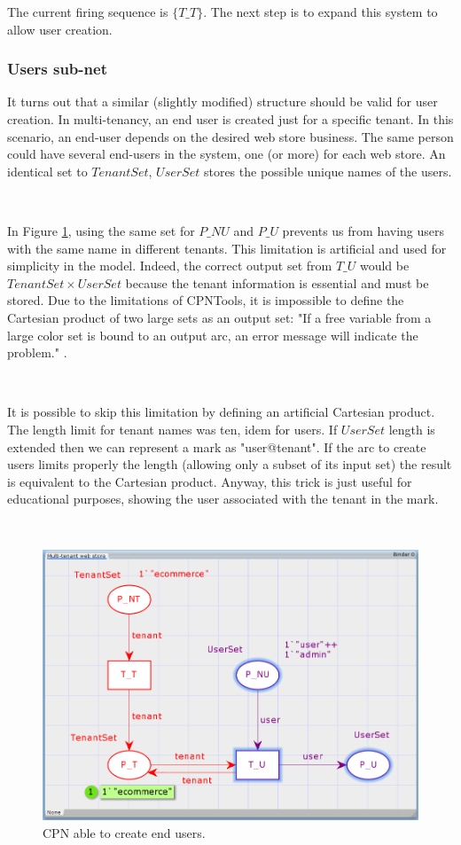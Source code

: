 \documentclass[12pt,english]{article} %
\begin{document}
The current firing sequence is $\{T\_T\}$.
The next step is to expand this system to allow user creation.

\subsubsection{Users sub-net}
It turns out that a similar (slightly modified) structure should be valid for user creation.
In multi-tenancy, an end user is created just for a specific tenant.
In this scenario, an end-user depends on the desired web store business.
The same person could have several end-users in the system, one (or more) for each web store.
An identical set to $TenantSet$, $UserSet$ stores the possible unique names of the users.

\ 

In Figure \ref{fig:mws-cpn-user-init}, using the same set for $P\_NU$ and $P\_U$ prevents us from having users with the same name in different tenants.
This limitation is artificial and used for simplicity in the model.
Indeed, the correct output set from $T\_U$ would be $TenantSet\times UserSet$ because the tenant information is essential and must be stored.
Due to the limitations of CPNTools, it is impossible to define the Cartesian product of two large sets as an output set: "If a free variable from a large color set is bound to an output arc, an error message will indicate the problem." \cite{cpn-tools-arc-inscriptions}.

\

It is possible to skip this limitation by defining an artificial Cartesian product.
The length limit for tenant names was ten, idem for users.
If $UserSet$ length is extended then we can represent a mark as "user@tenant".
If the arc to create users limits properly the length (allowing only a subset of its input set) the result is equivalent to the Cartesian product.
Anyway, this trick is just useful for educational purposes, showing the user associated with the tenant in the mark.

\

\begin{figure}[H]
    \centering
    \includegraphics[scale=0.55]{img/mws/cpn/mws_cpn_user_init.png}
    \caption{CPN able to create end users.}
    \label{fig:mws-cpn-user-init}
\end{figure}
\end{document}
